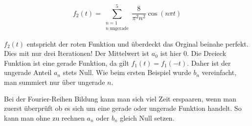 \begin{equation}
	f_2(t) = \sum_{\substack{n=1 \\ n\ \text{ungerade}}}^{5} \frac{8}{\pi^2 n^2} \cos(n\pi t)
\end{equation}

$f_2(t)$ entspricht der roten Funktion und überdeckt das Orginal beinahe perfekt. 
Dies mit nur drei Iterationen!
Der Mittelwert ist $a_0$ ist hier 0. 
Die Dreieck Funktion ist eine gerade Funktion, da gilt $f_1(t) = f_1(-t)$. 
Daher ist der ungerade Anteil $a_n$ stets Null. 
Wie beim ersten Beispiel wurde $b_n$ vereinfacht, man summiert nur über ungerade $n$. 


Bei der Fourier-Reihen Bildung kann man sich viel Zeit erspaaren, wenn man zuerst überprüft ob es sich um eine gerade oder ungerade Funktion handelt.
So kann man ohne zu rechnen $a_n$ oder $b_n$ gleich Null setzen.




